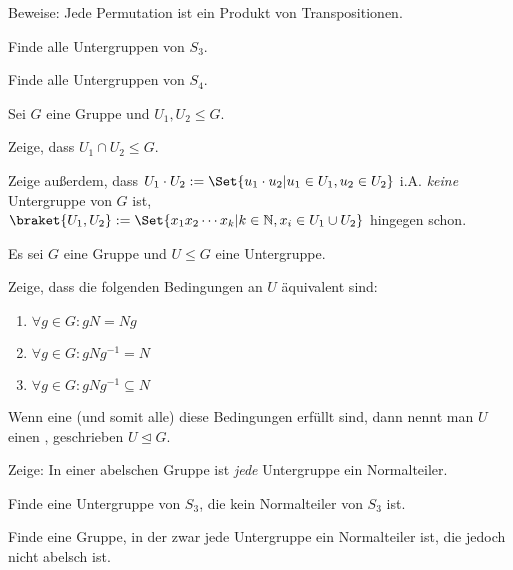 \begin{sheet}
\begin{problem}[title={Zyklenzerlegung}]
\begin{subproblem}[difficulty={mittel}]
Beweise: Jede Permutation ist ein Produkt von Transpositionen.
\end{subproblem}
\end{problem}

\begin{problem}
\begin{subproblem}[difficulty={leicht}]
Finde alle Untergruppen von $S_3$.
\end{subproblem}
\begin{subproblem}[difficulty={leicht, aber aufwändig}]
Finde alle Untergruppen von $S_4$.
\end{subproblem}
\end{problem}




\begin{problem}[title={Neue Untergruppen aus alten}]
Sei $G$ eine Gruppe und $U_1,U_2\leq G$.
\begin{subproblem}[difficulty={sehr leicht}]
Zeige, dass $U_1\cap U_2\leq G$.
\end{subproblem}
\begin{subproblem}[difficulty={leicht}]
Zeige außerdem, dass $U_1\cdot U_2 := \Set{u_1\cdot u_2 | u_1\in U_1, u_2\in U_2}$ i.A. \emph{keine} Untergruppe von $G$ ist, $\braket{U_1,U_2} := \Set{x_1 x_2 \cdots x_k | k\in\IN, x_i\in U_1\cup U_2}$ hingegen schon.
\end{subproblem}
\end{problem}

\begin{problem}
Es sei $G$ eine Gruppe und $U\leq G$ eine Untergruppe.
\begin{subproblem}[difficulty={leicht}]
Zeige, dass die folgenden Bedingungen an $U$ äquivalent sind:
\begin{enumerate}[label=(\roman*)]
\item $\forall g\in G: gN=Ng$
\item $\forall g\in G: gNg^{-1} = N$
\item $\forall g\in G: gNg^{-1} \subseteq N$
\end{enumerate}
\end{subproblem}
Wenn eine (und somit alle) diese Bedingungen erfüllt sind, dann nennt man $U$ einen , geschrieben $U\unlhd G$.

\begin{subproblem}[difficulty={sehr leicht}]
Zeige: In einer abelschen Gruppe ist \emph{jede} Untergruppe ein Normalteiler.
\end{subproblem}
\begin{subproblem}[difficulty={leicht}]
Finde eine Untergruppe von $S_3$, die kein Normalteiler von $S_3$ ist.
\end{subproblem}
\begin{subproblem}[difficulty={schwer}]
Finde eine Gruppe, in der zwar jede Untergruppe ein Normalteiler ist, die jedoch nicht abelsch ist.
\end{subproblem}
\end{problem}


\end{sheet}
